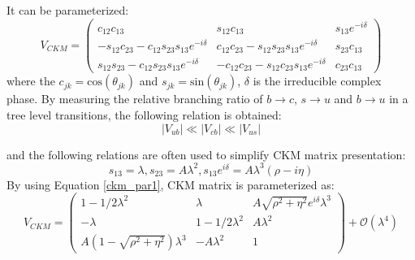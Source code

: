 It can be parameterized:
\begin{equation}
V_{CKM}=
\begin{pmatrix}
c_{12}c_{13} & s_{12}c_{13} & s_{13}e^{-i\delta }\\
-s_{12}c_{23}-c_{12}s_{23}s_{13}e^{-i\delta } &c_{12}c_{23}-s_{12}s_{23}s_{13}e^{-i\delta } & s_{23}c_{13}\\
s_{12}s_{23}-c_{12}s_{23}s_{13}e^{-i\delta }  & -c_{12}c_{23}-s_{12}c_{23}s_{13}e^{-i\delta } & c_{23}c_{13}
\end{pmatrix}
\end{equation}
where the $c_{jk}=\text{cos}(\theta_{jk})$ and $s_{jk}=\text{sin}(\theta_{jk})$, $\delta$ is the irreducible complex phase. By measuring the relative branching ratio of $b\to c$, $s\to u$ and $b\to u$ in a tree level transitions, the following relation is obtained: 
\begin{equation}
|V_{ub}|\ll |V_{cb}|\ll |V_{us}|
\end{equation}

and the following relations are often used to simplify CKM matrix presentation:
\begin{equation}\label{ckm_par1}
s_{13}=\lambda , s_{23}=A\lambda^2, s_{13}e^{i\delta}=A\lambda^3(\rho-i\eta)
\end{equation}
By using Equation \ref{ckm_par1}, CKM matrix is parameterized as:
\begin{equation}
V_{CKM}=
\begin{pmatrix}
1-1/2\lambda^2 & \lambda & A\sqrt{\rho^2+\eta^2}e^{i\delta}\lambda^3\\
-\lambda & 1-1/2\lambda^2 & A\lambda^2\\
A(1-\sqrt{\rho^2+\eta^2})\lambda^3& -A\lambda^2 & 1
\end{pmatrix}+\mathcal{O}(\lambda^4)
\end{equation}

